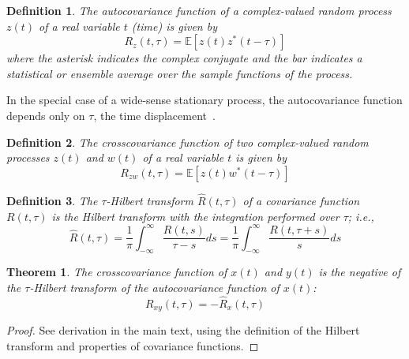\documentclass[12pt]{article}
\newtheorem{theorem}{Theorem}[section]
\newtheorem{definition}{Definition}[section]
\begin{document}
\begin{definition}
\label{def:autocovariance}
The \emph{autocovariance function} of a complex-valued random process $z(t)$ of a real variable $t$ (time) is given by
\begin{equation}
R_z(t,\tau) = \mathbb{E}[z(t)z^*(t-\tau)]
\label{eq:autocovariance}
\end{equation}
where the asterisk indicates the complex conjugate and the bar indicates a statistical or ensemble average over the sample functions of the process.
\end{definition}

In the special case of a wide-sense stationary process, the autocovariance function depends only on $\tau$, the time displacement~\cite{doob1953}.

\begin{definition}
\label{def:crosscovariance}
The \emph{crosscovariance function} of two complex-valued random processes $z(t)$ and $w(t)$ of a real variable $t$ is given by
\begin{equation}
R_{zw}(t, \tau) = \mathbb{E}[z(t)w^*(t-\tau)]
\label{eq:crosscovariance}
\end{equation}
\end{definition}

\begin{definition}
\label{def:hilbert_covariance}
The $\tau$-Hilbert transform $\hat{R}(t,\tau)$ of a covariance function $R(t,\tau)$ is the Hilbert transform with the integration performed over $\tau$; i.e.,
\begin{equation}
\hat{R}(t,\tau) = \frac{1}{\pi} \int_{-\infty}^{\infty} \frac{R(t,s)}{\tau-s} ds = \frac{1}{\pi} \int_{-\infty}^{\infty} \frac{R(t,\tau+s)}{s} ds
\label{eq:hilbert_covariance}
\end{equation}
\end{definition}

\begin{theorem}
\label{thm:crosscov_hilbert}
The crosscovariance function of $x(t)$ and $y(t)$ is the negative of the $\tau$-Hilbert transform of the autocovariance function of $x(t)$:
\begin{equation}
R_{xy}(t, \tau) = -\hat{R}_x(t, \tau)
\label{eq:crosscov_hilbert}
\end{equation}
\end{theorem}
\begin{proof}
See derivation in the main text, using the definition of the Hilbert transform and properties of covariance functions.
\end{proof}
\end{document}

